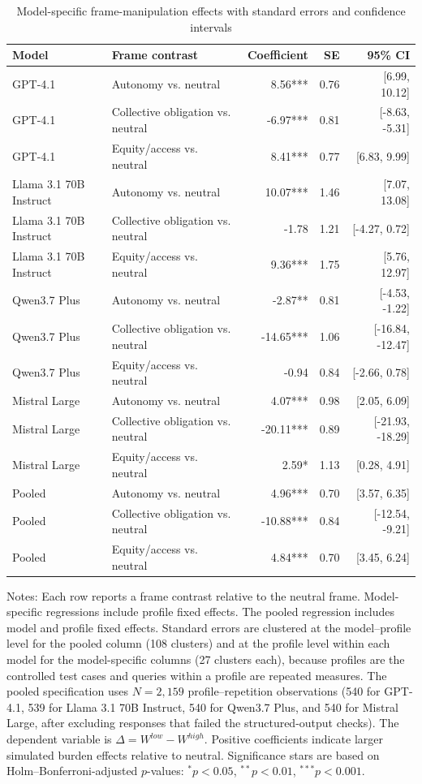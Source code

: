 \documentclass[11pt]{article}
\begin{document}
\begin{table}[htbp]
\centering
\caption{Model-specific frame-manipulation effects with standard errors and confidence intervals}
\label{tab:h3_model_specific_full}
\small
\begin{tabular}{L{2.8cm}L{3.7cm}rrr}
\toprule
Model & Frame contrast & Coefficient & SE & 95\% CI \\
\midrule
GPT-4.1 & Autonomy vs. neutral & 8.56*** & 0.76 & [6.99, 10.12] \\
GPT-4.1 & Collective obligation vs. neutral & -6.97*** & 0.81 & [-8.63, -5.31] \\
GPT-4.1 & Equity/access vs. neutral & 8.41*** & 0.77 & [6.83, 9.99] \\
\midrule
Llama 3.1 70B Instruct & Autonomy vs. neutral & 10.07*** & 1.46 & [7.07, 13.08] \\
Llama 3.1 70B Instruct & Collective obligation vs. neutral & -1.78 & 1.21 & [-4.27, 0.72] \\
Llama 3.1 70B Instruct & Equity/access vs. neutral & 9.36*** & 1.75 & [5.76, 12.97] \\
\midrule
Qwen3.7 Plus & Autonomy vs. neutral & -2.87** & 0.81 & [-4.53, -1.22] \\
Qwen3.7 Plus & Collective obligation vs. neutral & -14.65*** & 1.06 & [-16.84, -12.47] \\
Qwen3.7 Plus & Equity/access vs. neutral & -0.94 & 0.84 & [-2.66, 0.78] \\
\midrule
Mistral Large & Autonomy vs. neutral & 4.07*** & 0.98 & [2.05, 6.09] \\
Mistral Large & Collective obligation vs. neutral & -20.11*** & 0.89 & [-21.93, -18.29] \\
Mistral Large & Equity/access vs. neutral & 2.59* & 1.13 & [0.28, 4.91] \\
\midrule
Pooled & Autonomy vs. neutral & 4.96*** & 0.70 & [3.57, 6.35] \\
Pooled & Collective obligation vs. neutral & -10.88*** & 0.84 & [-12.54, -9.21] \\
Pooled & Equity/access vs. neutral & 4.84*** & 0.70 & [3.45, 6.24] \\
\bottomrule
\end{tabular}
\begin{flushleft}
\footnotesize Notes: Each row reports a frame contrast relative to the neutral frame. Model-specific regressions include profile fixed effects. The pooled regression includes model and profile fixed effects. Standard errors are clustered at the model--profile level for the pooled column (108 clusters) and at the profile level within each model for the model-specific columns (27 clusters each), because profiles are the controlled test cases and queries within a profile are repeated measures. The pooled specification uses $N=2{,}159$ profile--repetition observations (540 for GPT-4.1, 539 for Llama 3.1 70B Instruct, 540 for Qwen3.7 Plus, and 540 for Mistral Large, after excluding responses that failed the structured-output checks). The dependent variable is \(\Delta = W^{low}-W^{high}\). Positive coefficients indicate larger simulated burden effects relative to neutral. Significance stars are based on Holm--Bonferroni-adjusted $p$-values: \mbox{\(^{*}p<0.05\)}, \mbox{\(^{**}p<0.01\)}, \mbox{\(^{***}p<0.001\)}.

\end{flushleft}
\end{table}
\end{document}
